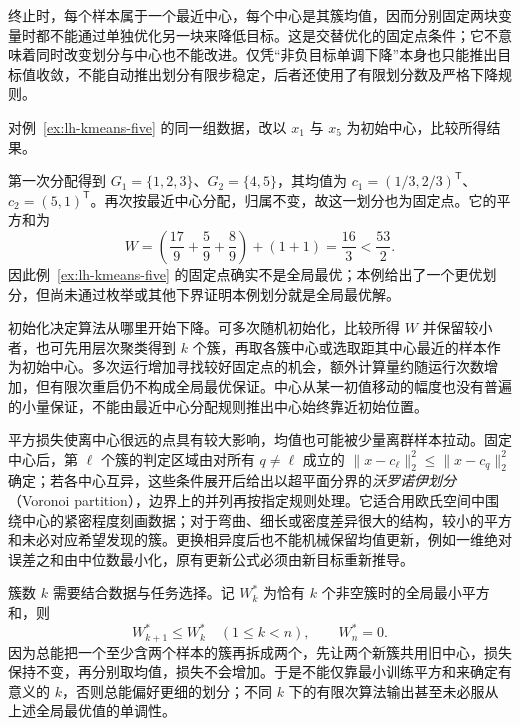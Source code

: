 终止时，每个样本属于一个最近中心，每个中心是其簇均值，因而分别固定两块变量时都不能通过单独优化另一块来降低目标。这是交替优化的固定点条件；它不意味着同时改变划分与中心也不能改进。仅凭“非负目标单调下降”本身也只能推出目标值收敛，不能自动推出划分有限步稳定，后者还使用了有限划分数及严格下降规则。

\begin{example}
\label{ex:lh-kmeans-initialization}
对例~\ref{ex:lh-kmeans-five} 的同一组数据，改以 $x_1$ 与 $x_5$ 为初始中心，比较所得结果。
\end{example}
\begin{solve}
第一次分配得到 $G_1=\{1,2,3\}$、$G_2=\{4,5\}$，其均值为 $c_1=(1/3,2/3)^{\mathsf T}$、$c_2=(5,1)^{\mathsf T}$。再次按最近中心分配，归属不变，故这一划分也为固定点。它的平方和为
\[
W=\left(\frac{17}{9}+\frac59+\frac89\right)+(1+1)
=\frac{16}{3}<\frac{53}{2}.
\]
因此例~\ref{ex:lh-kmeans-five} 的固定点确实不是全局最优；本例给出了一个更优划分，但尚未通过枚举或其他下界证明本例划分就是全局最优解。
\end{solve}

初始化决定算法从哪里开始下降。可多次随机初始化，比较所得 $W$ 并保留较小者，也可先用层次聚类得到 $k$ 个簇，再取各簇中心或选取距其中心最近的样本作为初始中心。多次运行增加寻找较好固定点的机会，额外计算量约随运行次数增加，但有限次重启仍不构成全局最优保证。中心从某一初值移动的幅度也没有普遍的小量保证，不能由最近中心分配规则推出中心始终靠近初始位置。

平方损失使离中心很远的点具有较大影响，均值也可能被少量离群样本拉动。固定中心后，第 $\ell$ 个簇的判定区域由对所有 $q\ne\ell$ 成立的 $\|x-c_\ell\|_2^2\leq\|x-c_q\|_2^2$ 确定；若各中心互异，这些条件展开后给出以超平面分界的\emph{沃罗诺伊划分}（Voronoi partition），边界上的并列再按指定规则处理。它适合用欧氏空间中围绕中心的紧密程度刻画数据；对于弯曲、细长或密度差异很大的结构，较小的平方和未必对应希望发现的簇。更换相异度后也不能机械保留均值更新，例如一维绝对误差之和由中位数最小化，原有更新公式必须由新目标重新推导。

簇数 $k$ 需要结合数据与任务选择。记 $W_k^*$ 为恰有 $k$ 个非空簇时的全局最小平方和，则
\begin{equation}
W_{k+1}^*\leq W_k^*\quad(1\leq k<n),\qquad W_n^*=0.
\label{eq:lh-kmeans-k-monotone}
\end{equation}
因为总能把一个至少含两个样本的簇再拆成两个，先让两个新簇共用旧中心，损失保持不变，再分别取均值，损失不会增加。于是不能仅靠最小训练平方和来确定有意义的 $k$，否则总能偏好更细的划分；不同 $k$ 下的有限次算法输出甚至未必服从上述全局最优值的单调性。

